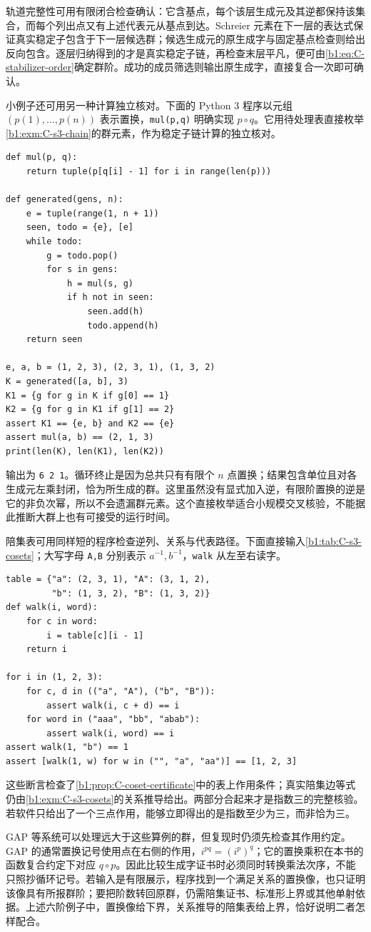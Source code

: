 \ProseParagraphBreak
轨道完整性可用有限闭合检查确认：它含基点，每个该层生成元及其逆都保持该集合，而每个列出点又有上述代表元从基点到达。Schreier 元素在下一层的表达式保证真实稳定子包含于下一层候选群；候选生成元的原生成字与固定基点检查则给出反向包含。逐层归纳得到的才是真实稳定子链，再检查末层平凡，便可由\eqref{b1:eq:C-stabilizer-order}确定群阶。成功的成员筛选则输出原生成字，直接复合一次即可确认。

\ProseParagraphBreak
小例子还可用另一种计算独立核对。下面的 Python 3 程序以元组 \((p(1),\ldots,p(n))\) 表示置换，\texttt{mul(p,q)} 明确实现 \(p\circ q\)。它用待处理表直接枚举\cref{b1:exm:C-s3-chain}的群元素，作为稳定子链计算的独立核对。
\begin{verbatim}
def mul(p, q):
    return tuple(p[q[i] - 1] for i in range(len(p)))

def generated(gens, n):
    e = tuple(range(1, n + 1))
    seen, todo = {e}, [e]
    while todo:
        g = todo.pop()
        for s in gens:
            h = mul(s, g)
            if h not in seen:
                seen.add(h)
                todo.append(h)
    return seen

e, a, b = (1, 2, 3), (2, 3, 1), (1, 3, 2)
K = generated([a, b], 3)
K1 = {g for g in K if g[0] == 1}
K2 = {g for g in K1 if g[1] == 2}
assert K1 == {e, b} and K2 == {e}
assert mul(a, b) == (2, 1, 3)
print(len(K), len(K1), len(K2))
\end{verbatim}
输出为 \texttt{6 2 1}。循环终止是因为总共只有有限个 \(n\) 点置换；结果包含单位且对各生成元左乘封闭，恰为所生成的群。这里虽然没有显式加入逆，有限阶置换的逆是它的非负次幂，所以不会遗漏群元素。这个直接枚举适合小规模交叉核验，不能据此推断大群上也有可接受的运行时间。

\ProseParagraphBreak
陪集表可用同样短的程序检查逆列、关系与代表路径。下面直接输入\cref{b1:tab:C-s3-cosets}；大写字母 \texttt{A,B} 分别表示 \(a^{-1},b^{-1}\)，\texttt{walk} 从左至右读字。
\begin{verbatim}
table = {"a": (2, 3, 1), "A": (3, 1, 2),
         "b": (1, 3, 2), "B": (1, 3, 2)}
def walk(i, word):
    for c in word:
        i = table[c][i - 1]
    return i

for i in (1, 2, 3):
    for c, d in (("a", "A"), ("b", "B")):
        assert walk(i, c + d) == i
    for word in ("aaa", "bb", "abab"):
        assert walk(i, word) == i
assert walk(1, "b") == 1
assert [walk(1, w) for w in ("", "a", "aa")] == [1, 2, 3]
\end{verbatim}
这些断言检查了\cref{b1:prop:C-coset-certificate}中的表上作用条件；真实陪集边等式仍由\cref{b1:exm:C-s3-cosets}的关系推导给出。两部分合起来才是指数三的完整核验。若软件只给出了一个三点作用，能够立即得出的是指数至少为三，而非恰为三。

\ProseParagraphBreak
GAP 等系统可以处理远大于这些算例的群，但复现时仍须先检查其作用约定。GAP 的通常置换记号使用点在右侧的作用，\(i^{pq}=(i^p)^q\)；它的置换乘积在本书的函数复合约定下对应 \(q\circ p\)。因此比较生成字证书时必须同时转换乘法次序，不能只照抄循环记号。若输入是有限展示，程序找到一个满足关系的置换像，也只证明该像具有所报群阶；要把阶数转回原群，仍需陪集证书、标准形上界或其他单射依据。上述六阶例子中，置换像给下界，关系推导的陪集表给上界，恰好说明二者怎样配合。
